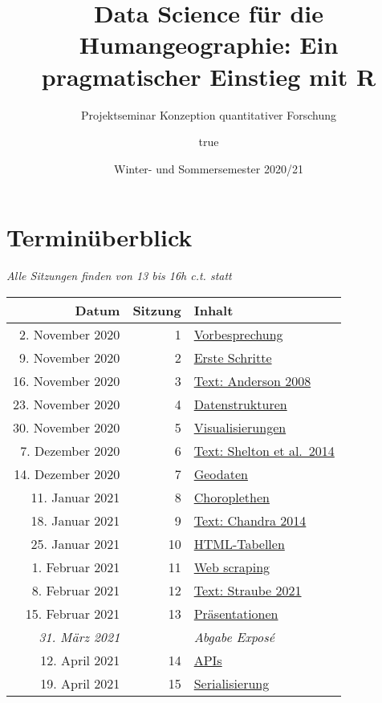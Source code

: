 \documentclass[
  ngerman,
]{article}
\title{Data Science für die Humangeographie: Ein pragmatischer Einstieg mit R}
\subtitle{Projektseminar Konzeption quantitativer Forschung}
\author{true}
\date{Winter- und Sommersemester 2020/21}
\begin{document}
\maketitle

{
\setcounter{tocdepth}{2}
\tableofcontents
}
\hypertarget{terminuxfcberblick}{%
\section*{Terminüberblick}\label{terminuxfcberblick}}

\emph{Alle Sitzungen finden von 13 bis 16h c.t. statt}

\begin{longtable}[]{@{}rrl@{}}
\toprule
Datum & Sitzung & Inhalt \\
\midrule
\endhead
2. November 2020 & 1 & \protect\hyperlink{vorbesprechung}{Vorbesprechung} \\
9. November 2020 & 2 & \protect\hyperlink{erste-schritte}{Erste Schritte} \\
16. November 2020 & 3 & \protect\hyperlink{text-anderson-2008}{Text: Anderson 2008} \\
23. November 2020 & 4 & \protect\hyperlink{datenstrukturen}{Datenstrukturen} \\
30. November 2020 & 5 & \protect\hyperlink{visualisierungen}{Visualisierungen} \\
7. Dezember 2020 & 6 & \protect\hyperlink{text-shelton-et-al.-2014}{Text: Shelton et al.~2014} \\
14. Dezember 2020 & 7 & \protect\hyperlink{geodaten}{Geodaten} \\
11. Januar 2021 & 8 & \protect\hyperlink{choroplethen}{Choroplethen} \\
18. Januar 2021 & 9 & \protect\hyperlink{text-chandra-2014}{Text: Chandra 2014} \\
25. Januar 2021 & 10 & \protect\hyperlink{html-tabellen}{HTML-Tabellen} \\
1. Februar 2021 & 11 & \protect\hyperlink{web-scraping}{Web scraping} \\
8. Februar 2021 & 12 & \protect\hyperlink{text-straube-2021}{Text: Straube 2021} \\
15. Februar 2021 & 13 & \protect\hyperlink{pruxe4sentationen}{Präsentationen} \\
\emph{31. März 2021} & & \emph{Abgabe Exposé} \\
12. April 2021 & 14 & \protect\hyperlink{apis}{APIs} \\
19. April 2021 & 15 & \protect\hyperlink{serialisierung}{Serialisierung} \\

\end{longtable}
\end{document}
